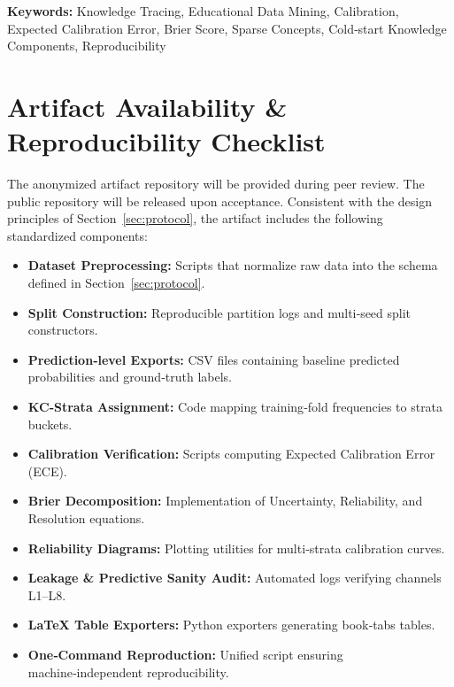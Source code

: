\documentclass[12pt,a4paper]{article}
\begin{document}
\vspace{10pt}
\noindent\textbf{Keywords:} Knowledge Tracing, Educational Data Mining, Calibration, Expected Calibration Error, Brier Score, Sparse Concepts, Cold‑start Knowledge Components, Reproducibility








\section*{Artifact Availability \& Reproducibility Checklist}
The anonymized artifact repository will be provided during peer review. The public repository will be released upon acceptance. Consistent with the design principles of Section~\ref{sec:protocol}, the artifact includes the following standardized components:
\begin{itemize}
  \item \textbf{Dataset Preprocessing:} Scripts that normalize raw data into the schema defined in Section~\ref{sec:protocol}.
  \item \textbf{Split Construction:} Reproducible partition logs and multi‑seed split constructors.
  \item \textbf{Prediction‑level Exports:} CSV files containing baseline predicted probabilities and ground‑truth labels.
  \item \textbf{KC‑Strata Assignment:} Code mapping training‑fold frequencies to strata buckets.
  \item \textbf{Calibration Verification:} Scripts computing Expected Calibration Error (ECE).
  \item \textbf{Brier Decomposition:} Implementation of Uncertainty, Reliability, and Resolution equations.
  \item \textbf{Reliability Diagrams:} Plotting utilities for multi‑strata calibration curves.
  \item \textbf{Leakage \& Predictive Sanity Audit:} Automated logs verifying channels L1--L8.
  \item \textbf{LaTeX Table Exporters:} Python exporters generating book‑tabs tables.
  \item \textbf{One‑Command Reproduction:} Unified script ensuring machine‑independent reproducibility.
\end{itemize}

\appendix




\end{document}
